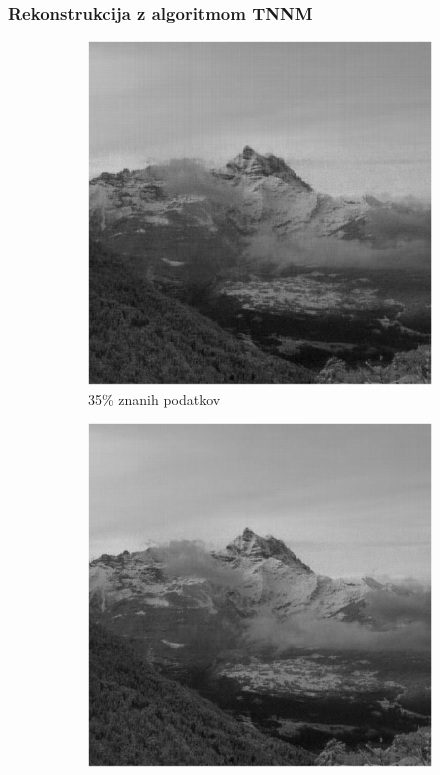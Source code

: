\documentclass{beamer}
\begin{document}
\begin{frame}
  \frametitle{Rekonstrukcija z algoritmom TNNM}
  \begin{figure}
    \begin{subfigure}{0.325\linewidth}
      \includegraphics[width=\linewidth]{slike/gora/slikaRez35TNNM.png}
      \caption{35\% znanih podatkov}
    \end{subfigure}
    \begin{subfigure}{0.325\linewidth}
      \includegraphics[width=\linewidth]{slike/gora/slikaRez45TNNM.png}

\end{subfigure}
\end{figure}
\end{frame}
\end{document}
